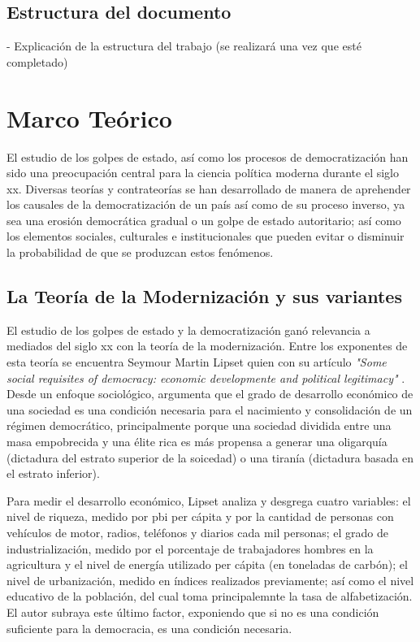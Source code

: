 \documentclass{article}
\begin{document}
\subsection{Estructura del documento}
- Explicación de la estructura del trabajo (se realizará una vez que esté completado)


\section{Marco Teórico}

El estudio de los golpes de estado, así como los procesos de democratización han sido una 
preocupación central para la ciencia política moderna durante el siglo xx. Diversas teorías
y contrateorías se han desarrollado de manera de aprehender los causales de la democratización
de un país así como de su proceso inverso, ya sea una erosión democrática gradual o un
golpe de estado autoritario; así como los elementos sociales, culturales e institucionales 
que pueden evitar o disminuir la probabilidad de que se produzcan estos fenómenos.

\subsection{La Teoría de la Modernización y sus variantes}

El estudio de los golpes de estado y la democratización ganó relevancia a mediados del 
siglo xx con la teoría de la modernización. Entre los exponentes de esta teoría se
encuentra Seymour Martin Lipset quien con su artículo \textit{"Some social requisites 
of democracy: economic developmente and political legitimacy"} \citeyear{lipset1959some}. 
Desde un enfoque sociológico, 
argumenta que el grado de desarrollo económico de una sociedad es una condición 
necesaria para el nacimiento y consolidación de un régimen democrático, principalmente
porque una sociedad dividida entre una masa empobrecida y una élite rica es más
propensa a generar una oligarquía (dictadura del estrato superior de la soicedad) o una
tiranía (dictadura basada en el estrato inferior).

Para medir el desarrollo económico, Lipset analiza y desgrega cuatro variables:
el nivel de riqueza, medido por pbi per cápita y por la cantidad de personas con vehículos 
de motor, radios, teléfonos y diarios cada mil personas; el grado de industrialización, 
medido por el porcentaje de trabajadores hombres en la agricultura y el nivel de energía 
utilizado per cápita (en toneladas de carbón); el nivel de urbanización, medido en índices 
realizados previamente; así como el nivel educativo de la población, del cual toma 
principalemnte la tasa de alfabetización. El autor subraya este último factor, exponiendo
que si no es una condición suficiente para la democracia, es una condición necesaria.
\end{document}
